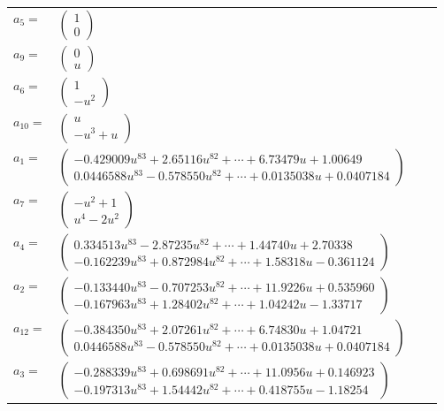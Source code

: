 \documentclass[1p]{elsarticle_modified}
\theoremstyle{definition}
\begin{document}
\begin{tabular}{m{7pt} m{180pt} m{7pt} m{180pt} }
\flushright $a_{5}=$&$\begin{pmatrix}1\\0\end{pmatrix}$ \\
\flushright $a_{9}=$&$\begin{pmatrix}0\\u\end{pmatrix}$ \\
\flushright $a_{6}=$&$\begin{pmatrix}1\\- u^2\end{pmatrix}$ \\
\flushright $a_{10}=$&$\begin{pmatrix}u\\- u^3+u\end{pmatrix}$ \\
\flushright $a_{1}=$&$\begin{pmatrix}-0.429009 u^{83}+2.65116 u^{82}+\cdots+6.73479 u+1.00649\\0.0446588 u^{83}-0.578550 u^{82}+\cdots+0.0135038 u+0.0407184\end{pmatrix}$ \\
\flushright $a_{7}=$&$\begin{pmatrix}- u^2+1\\u^4-2 u^2\end{pmatrix}$ \\
\flushright $a_{4}=$&$\begin{pmatrix}0.334513 u^{83}-2.87235 u^{82}+\cdots+1.44740 u+2.70338\\-0.162239 u^{83}+0.872984 u^{82}+\cdots+1.58318 u-0.361124\end{pmatrix}$ \\
\flushright $a_{2}=$&$\begin{pmatrix}-0.133440 u^{83}-0.707253 u^{82}+\cdots+11.9226 u+0.535960\\-0.167963 u^{83}+1.28402 u^{82}+\cdots+1.04242 u-1.33717\end{pmatrix}$ \\
\flushright $a_{12}=$&$\begin{pmatrix}-0.384350 u^{83}+2.07261 u^{82}+\cdots+6.74830 u+1.04721\\0.0446588 u^{83}-0.578550 u^{82}+\cdots+0.0135038 u+0.0407184\end{pmatrix}$ \\
\flushright $a_{3}=$&$\begin{pmatrix}-0.288339 u^{83}+0.698691 u^{82}+\cdots+11.0956 u+0.146923\\-0.197313 u^{83}+1.54442 u^{82}+\cdots+0.418755 u-1.18254\end{pmatrix}$ \\

\end{tabular}
\end{document}
